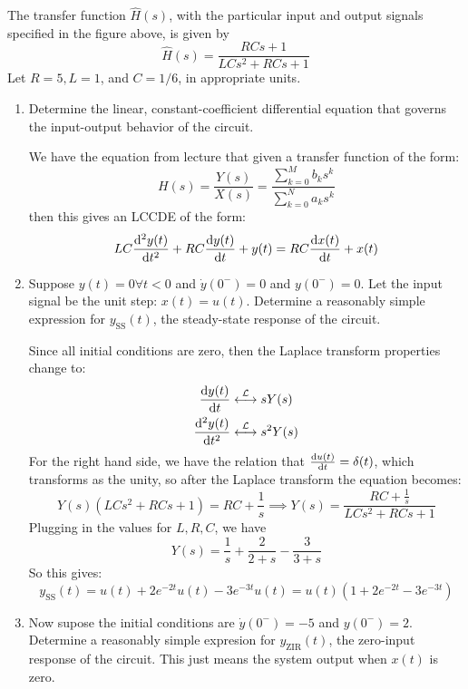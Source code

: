 \documentclass[10pt]{article}
\begin{document}
	The transfer function \( \hat{H}(s) \), with the particular input and output signals specified in the figure 
	above, is given by
	\[
	\hat{H}(s) = \frac{RCs + 1}{LC s^2 + RCs + 1}
	\] 
	Let \( R = 5, L = 1 \), and \( C = 1 / 6 \), in appropriate units. 
	\begin{enumerate}[label=\alph*)]
		\item Determine the linear, constant-coefficient differential equation that governs the input-output 
			behavior of the circuit. 

			\begin{solution}
				We have the equation from lecture that given a transfer function of the form:
				\[
				H(s) = \frac{Y(s)}{X(s)} = \frac{\sum_{k=0}^{M} b_k s^{k}}{\sum_{k=0}^{N} a_k s^{k}}
				\] 
				then this gives an LCCDE of the form:
				\[
					LC \dv[2]{y(t)}{t} + RC \dv{y(t)}{t} + y(t) = RC \dv{x(t)}{t} + x(t)	
				\] 
			\end{solution}
		\item Suppose \( y(t) = 0 \forall t < 0 \) and \( \dot y(0^{-}) = 0 \) and \( y(0^{-}) = 0 \). Let the 
			input signal be the unit step: \( x(t) = u(t) \). Determine a reasonably simple expression for 
			\( y_{\text{SS}}(t) \), the steady-state response of the circuit. 

			\begin{solution}
				Since all initial conditions are zero, then the Laplace transform properties change to:
				\begin{align*}
					\dv{y(t)}{t} &\overset{\mathcal L}{\longleftrightarrow} s Y(s)\\
					\dv[2]{y(t)}{t} & \overset{\mathcal L}{\longleftrightarrow} s^2 Y(s) 
				\end{align*}
				For the right hand side, we have the relation that \( \dv{u(t)}{t} = \delta(t) \), which transforms 
				as the unity, so after the Laplace transform the equation becomes:
				\[
				Y(s)(LCs^2 + RCs + 1) = RC + \frac{1}{s}\implies Y(s) = \frac{RC + \frac{1}{s}}{LCs^2 + RCs + 1}
				\] 
				Plugging in the values for \( L, R, C \), we have
				\[
				Y(s) = \frac{1}{s} + \frac{2}{2 + s} - \frac{3}{3+s}
				\] 
				So this gives:
				\[
				y_{\text{SS}}(t) = u(t) + 2e^{-2t}u(t) - 3e^{-3t}u(t) = u(t)(1 + 2e^{-2t} - 3e^{-3t})
				\] 
			\end{solution}
		\item Now supose the initial conditions are \( \dot y(0^{-}) = -5 \) and \( y(0^{-}) = 2 \). Determine 
			a reasonably simple expresion for \( y_{\text{ZIR}}(t) \), the zero-input response of the circuit. 
			This just means the system output when \( x(t) \) is zero. 


\end{enumerate}
\end{document}
